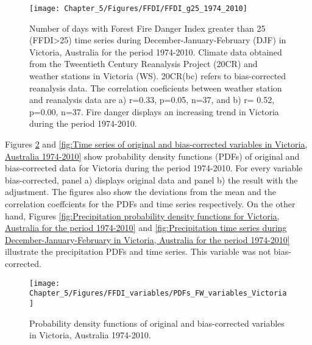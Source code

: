 \begin{figure}[h]
\noindent \begin{centering}
\texttt{[image: Chapter\_5/Figures/FFDI/FFDI\_g25\_1974\_2010]}
\par\end{centering}

\noindent \centering{}\caption{Number of days with Forest Fire Danger Index greater than 25 (FFDI>25)
time series during December-January-February (DJF) in Victoria, Australia
for the period 1974-2010. Climate data obtained from the Tweentieth
Century Reanalysis Project (20CR) and weather stations in Victoria
(WS). 20CR(bc) refers to bias-corrected reanalysis data. The correlation
coeficients between weather station and reanalysis data are a) r=0.33,
p=0.05, n=37, and b) r= 0.52, p=0.00, n=37. Fire danger displays an
increasing trend in Victoria during the period 1974-2010. \label{fig: Number of days with Forest Fire Danger Index greater than 25 time series during December-January-February in Victoria, Australia for the period 1974-2010}}
\end{figure}


Figures \ref{fig:Probability density functions of original and bias-corrected variables in Victoria, Australia 1974-2010}
and \ref{fig:Time series of original and bias-corrected variables in Victoria, Australia 1974-2010}
show probability density functions (PDFs) of original and bias-corrected
data for Victoria during the period 1974-2010. For every variable
bias-corrected, panel a) displays original data and panel b) the result
with the adjustment. The figures also show the deviations from the
mean and the correlation coeffcients for the PDFs and time series
respectively. On the other hand, Figures \ref{fig:Precipitation probability density functions for Victoria, Australia for the period 1974-2010}
and \ref{fig:Precipitation time series during December-January-February in Victoria, Australia for the period 1974-2010}
illustrate the precipitation PDFs and time series. This variable was
not bias-corrected.

\begin{figure}[h]
\noindent \begin{centering}
\texttt{[image: Chapter\_5/Figures/FFDI\_variables/PDFs\_FW\_variables\_Victoria]}
\par\end{centering}

\caption[Probability density functions of original and bias-corrected variables
in Victoria, Australia 1974-2010]{Probability density functions of original and bias-corrected variables
in Victoria, Australia 1974-2010. \label{fig:Probability density functions of original and bias-corrected variables in Victoria, Australia 1974-2010} }


\end{figure}


